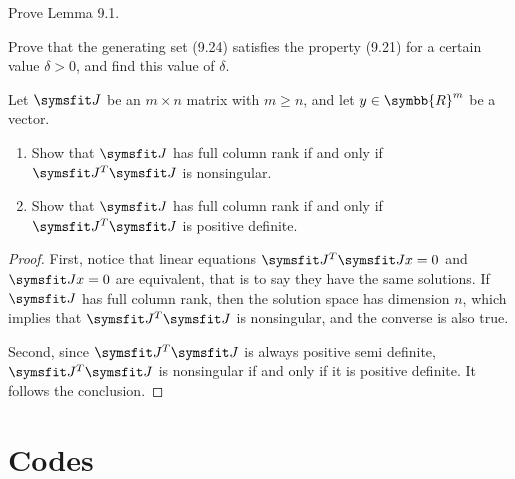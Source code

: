 \documentclass{assignment}[2019/10/15]
\begin{document}
    \begin{problem}
        Prove Lemma 9.1.
    \end{problem}
    \begin{problem}
        Prove that the generating set (9.24) satisfies the property (9.21) for a certain value $\delta>0$, and find this value of $\delta$.
    \end{problem}
    \begin{problem}
        Let $\matr{J}$ be an $m\times n$ matrix with $m\geq n$, and let $y\in\symbb{R}^m$ be a vector.
        \begin{enumerate}
            \item Show that $\matr{J}$ has full column rank if and only if $\matr{J}^T\matr{J}$ is nonsingular.
            \item Show that $\matr{J}$ has full column rank if and only if $\matr{J}^T\matr{J}$ is positive definite.
        \end{enumerate}
    \end{problem}
    \begin{proof}
        First, notice that linear equations $\matr{J}^T\matr{J}x=0$ and $\matr{J}x=0$ are equivalent, that is to say they have the same solutions. If $\matr{J}$ has full column rank, then the solution space has dimension $n$, which implies that $\matr{J}^T\matr{J}$ is nonsingular, and the converse is also true.

        Second, since $\matr{J}^T\matr{J}$ is always positive semi definite, $\matr{J}^T\matr{J}$ is nonsingular if and only if it is positive definite. It follows the conclusion.
    \end{proof}

    \clearpage\appendix
    \section{Codes}

\end{document}
